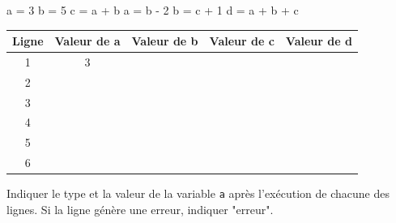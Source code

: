 \documentclass[a4paper,10pt]{report}
\def\ptsexoC{3}
\begin{document}
\begin{minipage}{0.29\linewidth}

\begin{CodePythontexAlt}[TaillePolice=\large,Largeur=1\linewidth,Centre,PremLigne=1]{}
a = 3
b = 5
c = a + b
a = b - 2
b = c + 1
d = a + b + c
\end{CodePythontexAlt}

\end{minipage}\hfill
\begin{minipage}{0.66\linewidth}
    
    \medskip

    \begin{tabular}{|c|c|c|c|c|}
        \hline
        Ligne& Valeur de a & Valeur de b &Valeur de c & Valeur de d\\ \hline
        1&3&&&\\\hline
        2&&&&\\\hline
        3&&&&\\\hline
        4&&&&\\\hline
        5&&&&\\\hline
        6&&&&\\\hline


    \end{tabular}
\end{minipage}

\bigskip

\exods{\ptsexoC}

Indiquer le type et la valeur de la variable \verb|a| après l'exécution de chacune des lignes. Si la ligne génère une erreur, indiquer "erreur".
\end{document}

